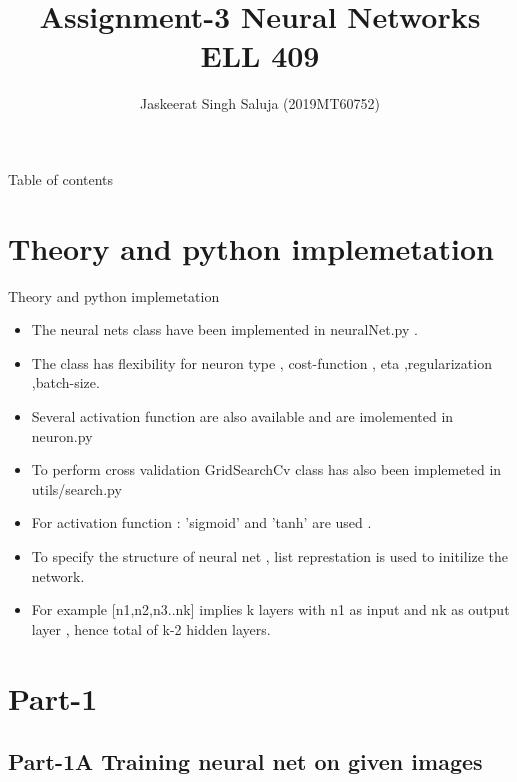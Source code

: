 \documentclass[12pt,t]{beamer}
\author{Jaskeerat Singh Saluja (2019MT60752)}
\title{Assignment-3 Neural Networks \\ ELL 409}
\begin{document}
\begin{frame}[t]
    \titlepage
\end{frame}
    
\begin{frame}[t]{Table of contents}
    \scriptsize
    \tableofcontents
\end{frame}

\section{Theory and python implemetation}
\begin{frame}[t]{Theory and python implemetation }
    \scriptsize
    \begin{itemize}
        \item The neural nets class have been implemented in neuralNet.py . 
        \item The class has flexibility for neuron type , cost-function , eta ,regularization ,batch-size.
        \item Several activation function are also available and are imolemented in neuron.py
        \item To perform cross validation GridSearchCv class has also been implemeted in utils/search.py
        \item For activation function : 'sigmoid' and 'tanh' are used .
        \item To specify the structure of neural net , list represtation is used to initilize the network.
        \item For example [n1,n2,n3..nk] implies k layers with n1 as input and nk as output layer , hence total
                of k-2 hidden layers. 

    \end{itemize}
\end{frame}


\section{Part-1}
\subsection{Part-1A Training neural net on given images}
\end{document}
